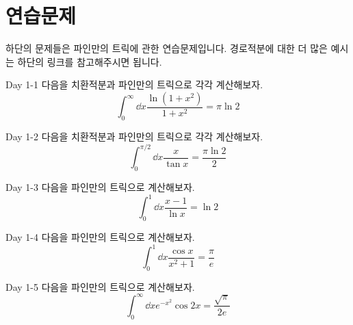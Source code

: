 \documentclass[11pt]{book}
\begin{document}
\newpage



\section{연습문제}
\begin{MLPar}
하단의 문제들은 파인만의 트릭에 관한 연습문제입니다.
경로적분에 대한 더 많은 예시는 하단의 링크를 참고해주시면 됩니다.%
\end{MLPar}

\begin{prob}{Day 1-1}
다음을 치환적분과 파인만의 트릭으로 각각 계산해보자.
\[
\int_{0}^{\infty}\dd{x} \frac{\ln(1+x^2)}{1+x^2} = \pi \ln 2
\]
\end{prob}
\medskip

\begin{prob}{Day 1-2}
다음을 치환적분과 파인만의 트릭으로 각각 계산해보자.
\[
\int_{0}^{\pi/2}\dd{x} \frac{x}{\tan x} = \frac{\pi \ln 2}{2}
\]
\end{prob}
\medskip

\begin{prob}{Day 1-3}
다음을 파인만의 트릭으로 계산해보자.
\[
\int_{0}^{1}\dd{x} \frac{x-1}{\ln x} = \ln 2
\]
\end{prob}
\medskip

\begin{prob}{Day 1-4}
다음을 파인만의 트릭으로 계산해보자.
\[
\int_{0}^{1}\dd{x} \frac{\cos x}{x^2+1} = \frac{\pi}{e}
\]
\end{prob}
\medskip

\begin{prob}{Day 1-5}
다음을 파인만의 트릭으로 계산해보자.
\[
\int_{0}^{\infty}\dd{x} e^{-x^2}\cos 2x = \frac{\sqrt{\pi}}{2e}
\]
\end{prob}
\medskip
\end{document}
